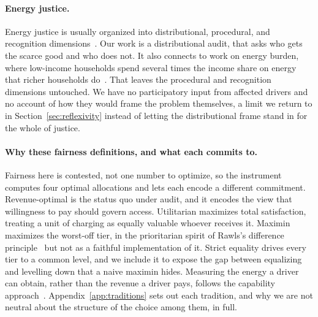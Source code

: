 \documentclass[manuscript, screen, review, anonymous]{acmart}
\begin{document}
\paragraph{Energy justice.}
Energy justice is usually organized into distributional, procedural, and recognition dimensions~\cite{sovacool2015energy,jenkins2016energy}. Our work is a distributional audit, that asks who gets the scarce good and who does not. It also connects to work on energy burden, where low-income households spend several times the income share on energy that richer households do~\cite{drehobl2020high,bednar2020recognition}. That leaves the procedural and recognition dimensions untouched. We have no participatory input from affected drivers and no account of how they would frame the problem themselves, a limit we return to in Section~\ref{sec:reflexivity} instead of letting the distributional frame stand in for the whole of justice.

\paragraph{Why these fairness definitions, and what each commits to.}
Fairness here is contested, not one number to optimize, so the instrument computes four optimal allocations and lets each encode a different commitment. Revenue-optimal is the status quo under audit, and it encodes the view that willingness to pay should govern access. Utilitarian maximizes total satisfaction, treating a unit of charging as equally valuable whoever receives it. Maximin maximizes the worst-off tier, in the prioritarian spirit of Rawls's difference principle~\cite{rawls2017theory} but not as a faithful implementation of it. Strict equality drives every tier to a common level, and we include it to expose the gap between equalizing and levelling down that a naive maximin hides. Measuring the energy a driver can obtain, rather than the revenue a driver pays, follows the capability approach~\cite{sen2014development}. Appendix~\ref{app:traditions} sets out each tradition, and why we are not neutral about the structure of the choice among them, in full.
\end{document}
